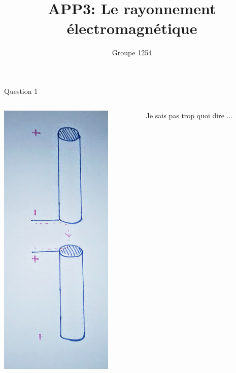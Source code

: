 \documentclass{beamer}
\title{APP3: Le rayonnement électromagnétique}
\author{Groupe 1254}
\begin{document}
\begin{frame}
	\maketitle
\end{frame}
\begin{frame}{Question 1}
	\begin{columns}
		\begin{column}{0.40\textwidth}
			\begin{center}
	    		\includegraphics[scale=0.3, angle=90]{question1.png}
        		\end{center}
        	\end{column}
        	\begin{column}{0.40\textwidth}
			\begin{center}
	    Je sais pas trop quoi dire ...
        	\end{center}
        	\end{column}
        	\end{columns}
        	
        	\end{frame}
\end{document}
